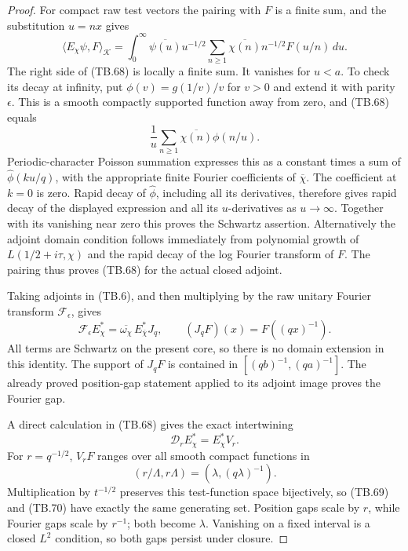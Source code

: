 \begin{proof}
For compact raw test vectors the pairing with \(F\) is a
finite sum, and the substitution \(u=nx\) gives
\[
 \langle E_\chi\psi,F\rangle_{\mathcal K}
 =\int_0^\infty\overline{\psi(u)}
       u^{-1/2}\sum_{n\geq1}
          \overline{\chi(n)}n^{-1/2}F(u/n)\,du.
\]
The right side of (TB.68) is locally a finite sum.
It vanishes for \(u<a\).
To check its decay at infinity, put
\(\phi(v)=g(1/v)/v\) for \(v>0\) and extend it with parity
\(\epsilon\).
This is a smooth compactly supported function away from zero,
and (TB.68) equals
\[
             \frac1u\sum_{n\geq1}\overline{\chi(n)}\phi(n/u).
\]
Periodic-character Poisson summation expresses this as a
constant times a sum of \(\widehat\phi(ku/q)\), with the
appropriate finite Fourier coefficients of \(\overline\chi\).
The coefficient at \(k=0\) is zero.
Rapid decay of \(\widehat\phi\), including all its derivatives,
therefore gives rapid decay of the displayed expression and
all its \(u\)-derivatives as \(u\to\infty\).
Together with its vanishing near zero this proves the
Schwartz assertion.  Alternatively the adjoint domain
condition follows immediately from polynomial growth of
\(L(1/2+i\tau,\chi)\) and the rapid decay of the log Fourier
transform of \(F\).
The pairing thus proves (TB.68) for the actual closed adjoint.

Taking adjoints in (TB.6), and then multiplying by the raw
unitary Fourier transform \(\mathcal F_\epsilon\), gives
\[
 \mathcal F_\epsilon E_\chi^*
        =\overline{\omega_\chi}\,E_{\overline\chi}^*J_q,
 \qquad (J_qF)(x)=F((qx)^{-1}).
 \tag{TB.71}
\]
All terms are Schwartz on the present core, so there is no
domain extension in this identity.
The support of \(J_qF\) is contained in
\([(qb)^{-1},(qa)^{-1}]\).
The already proved position-gap statement applied to its
adjoint image proves the Fourier gap.

A direct calculation in (TB.68) gives the exact intertwining
\[
                 \mathscr D_rE_\chi^*=E_\chi^*V_r.
 \tag{TB.72}
\]
For \(r=q^{-1/2}\), \(V_rF\) ranges over all smooth compact
functions in
\[
        (r/\Lambda,r\Lambda)
          =(\lambda,(q\lambda)^{-1}).
 \]
Multiplication by \(t^{-1/2}\) preserves this test-function
space bijectively, so (TB.69) and (TB.70) have exactly the
same generating set.
Position gaps scale by \(r\), while Fourier gaps scale by
\(r^{-1}\); both become \(\lambda\).
Vanishing on a fixed interval is a closed \(L^2\) condition,
so both gaps persist under closure.


\end{proof}
